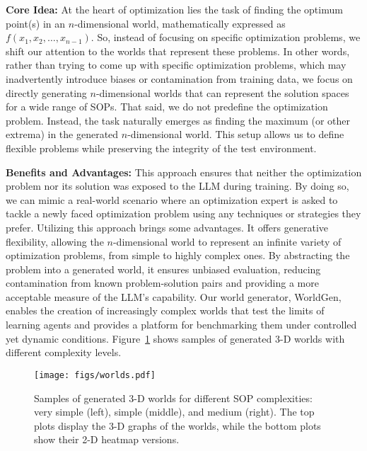 \textbf{Core Idea:} 
At the heart of optimization lies the task of finding the optimum point(s) in an \(n\)-dimensional world, mathematically expressed as \(f(x_1, x_2, \dots, x_{n-1})\). So, instead of focusing on specific optimization problems, we shift our attention to the worlds that represent these problems. In other words, rather than trying to come up with specific optimization problems, which may inadvertently introduce biases or contamination from training data, we focus on directly generating \(n\)-dimensional worlds that can represent the solution spaces for a wide range of SOPs.
That said, we do not predefine the optimization problem. Instead, the task naturally emerges as finding the maximum (or other extrema) in the generated \(n\)-dimensional world. This setup allows us to define flexible problems while preserving the integrity of the test environment.

\textbf{Benefits and Advantages:} This approach ensures that neither the optimization problem nor its solution was exposed to the LLM during training. By doing so, we can mimic a real-world scenario where an optimization expert is asked to tackle a newly faced optimization problem using any techniques or strategies they prefer. Utilizing this approach brings some advantages. It offers generative flexibility, allowing the \(n\)-dimensional world to represent an infinite variety of optimization problems, from simple to highly complex ones. By abstracting the problem into a generated world, it ensures unbiased evaluation, reducing contamination from known problem-solution pairs and providing a more acceptable measure of the LLM's capability. Our world generator, WorldGen, enables the creation of increasingly complex worlds that test the limits of learning agents and provides a platform for benchmarking them under controlled yet dynamic conditions. 
Figure~\ref{fig:worlds} shows samples of generated 3-D worlds with different complexity levels.

\begin{figure}[!t]
\begin{center}
\centerline{
\texttt{[image: figs/worlds.pdf]}
}
\caption{Samples of generated 3-D worlds for different SOP complexities: very simple (left), simple (middle), and medium (right). The top plots display the 3-D graphs of the worlds, while the bottom plots show their 2-D heatmap versions.}
\label{fig:worlds}
\end{center}
\vskip -0.2in
\end{figure}

